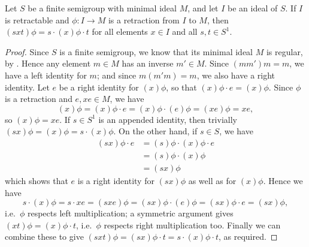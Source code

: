 \begin{lemma}
  \label{lem:retract-aux}
  Let $S$ be a finite semigroup with minimal ideal $M$, and let $I$ be
  an ideal of $S$.  If $I$ is retractable and $\phi: I \rightarrow M$ is a
  retraction from $I$ to $M$, then $(sxt)\phi=s \cdot (x)\phi \cdot t$ for all
  elements $x \in I$ and all $s,t\in S^1$.
  \begin{proof}
    Since $S$ is a finite semigroup, we know that its minimal ideal $M$ is
    regular, by \cite[Proposition 3.1.4]{howie}.  Hence
    any element $m \in M$ has an inverse $m' \in M$.  Since $(mm')m = m$, we
    have a left identity for $m$; and since $m(m'm) = m$, we also have a right
    identity.  Let $e$ be a right identity for $(x)\phi$, so that
    $(x)\phi \cdot e = (x)\phi$.  Since $\phi$ is a retraction and
    $e, xe \in M$, we have
    $$(x)\phi=(x)\phi \cdot e = (x)\phi \cdot (e)\phi = (xe)\phi = xe,$$
    so $(x)\phi = xe$.
    If $s \in S^1$ is an appended identity, then trivially $(sx)\phi = (x)\phi =
    s \cdot (x)\phi$.  On the other hand, if $s \in S$, we have
    \begin{align*}
      (sx)\phi \cdot e & = (s)\phi \cdot (x)\phi \cdot e \\
                       & = (s)\phi \cdot (x)\phi \\
                       & = (sx)\phi
    \end{align*}
    which shows that $e$ is a right identity for $(sx)\phi$ as well as for
    $(x)\phi$.  Hence we have
    $$s \cdot (x)\phi = s \cdot xe = (sxe)\phi = (sx)\phi \cdot (e)\phi =
    (sx)\phi \cdot e = (sx)\phi,$$ i.e.~$\phi$ respects left multiplication; a
    symmetric argument gives $(xt)\phi = (x)\phi \cdot t$, i.e.~$\phi$ respects
    right multiplication too.  Finally we can combine these to give
    $(sxt)\phi = (sx)\phi \cdot t = s \cdot (x)\phi \cdot t$, as required.
  \end{proof}
\end{lemma}

